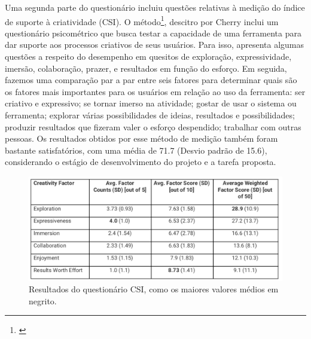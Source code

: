 Uma segunda parte do questionário incluiu questões relativas à medição do índice de suporte à criatividade (CSI). O método\footnote{\cite{Cherry2014}}, descitro por Cherry inclui um questionário psicométrico que busca testar a capacidade de uma ferramenta para dar suporte aos processos criativos de seus usuários. Para isso, apresenta algumas questões a respeito do desempenho em quesitos de exploração, expressividade, imersão, colaboração, prazer, e resultados em função do esforço. Em seguida, fazemos uma comparação par a par entre seis fatores para determinar quais são os fatores mais importantes para os usuários em relação ao uso da ferramenta: ser criativo e expressivo; se tornar imerso na atividade; gostar de usar o sistema ou ferramenta; explorar várias possibilidades de ideias, resultados e possibilidades; produzir resultados que fizeram valer o esforço despendido; trabalhar com outras pessoas. Os resultados obtidos por esse método de medição também foram bastante satisfatórios, com uma média de 71.7 (Desvio padrão de 15.6), considerando o estágio de desenvolvimento do projeto e a tarefa proposta.


\begin{figure}

\includegraphics[width=1\textwidth]{pictures/cap4/CSI}
\caption{Resultados do questionário CSI, como os maiores valores médios em negrito.}
\label{fig:questionnaire}
\end{figure}


 

